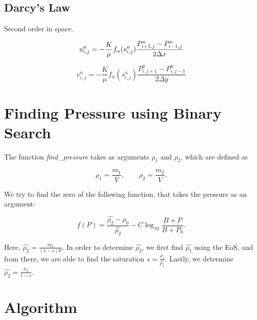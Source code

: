 \documentclass[a4paper,12pt]{article}
\begin{document}
\subsection{Darcy's Law}

Second order in space.

\[
    u_{i,j}^n = -\frac{K}{\mu} f_\alpha (s_{i, j}^n)
    \frac{P_{i + 1, j}^n - P_{i - 1, j}^n}{2\Delta x} \\
\] 

\[
    v_{i,j}^n = -\frac{K}{\mu} f_\alpha(s_{i, j}^n)
    \frac{P_{i, j + 1}^n - P_{i, j - 1}^n}{2\Delta y}
\] 

\section{Finding Pressure using Binary Search}

The function \emph{find\_pressure} takes as arguments
\(\rho_1\) and \(\rho_2\), which are defined as

\[
\rho_1 = \frac{m_1}{V}, \qquad
\rho_2 = \frac{m_2}{V}
.\] 

We try to find the zero of the following function, that
takes the pressure as an argument:

\begin{equation*}
    f(P) = \frac{\hat{\rho_2} - \rho_0}{\hat{\rho_2}}
    - C \log_{10} \frac{B + P}{B + P_0}
.\end{equation*}

Here, \(\hat{\rho_2} = \frac{m_2}{(1 - s)V}\).
In order to determine \(\hat{\rho_2}\), we first find
\(\hat{\rho_1}\) using the EoS, and from there, we are
able to find the saturation
\(s = \frac{\rho_1}{\hat{\rho_1}}\).
Lastly, we determine \(\hat{\rho_2} = \frac{\rho_2}{1 - s}\).

% 
% 
% 
\section{Algorithm}
\end{document}
